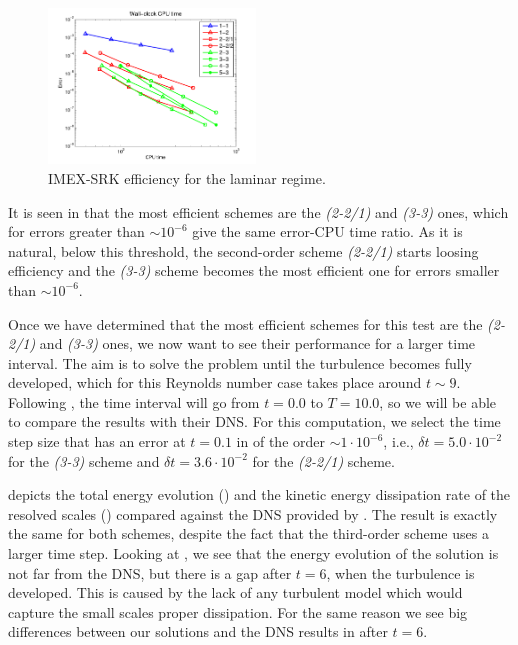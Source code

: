 \begin{figure}[h!]
  \centering
  \includegraphics[width=0.49\textwidth]{Figures/Chapter6/TGV/imex_nsi_explcnv_64_T0_Re1600_dt6dot25e-3_effi}
  \caption{IMEX-SRK efficiency for the laminar regime.}
  \label{fig-TGV_effi_laminar}
\end{figure}
It is seen in  that the most efficient schemes are the \textit{(2-2/1)} and  \textit{(3-3)} ones, which for errors greater than $\sim10^{-6}$ give the same error-CPU time ratio. As it is natural, below this threshold, the second-order scheme \textit{(2-2/1)} starts loosing efficiency and the \textit{(3-3)} scheme becomes the most efficient one for errors smaller than $\sim10^{-6}$.

Once we have determined that the most efficient schemes for this test are the \textit{(2-2/1)} and \textit{(3-3)} ones, we now want to see their performance for a larger time interval. The aim is to solve the problem until the turbulence becomes fully developed, which for this Reynolds number case takes place around $t\sim9$. Following \cite{brachet_direct_1991}, the time interval will go from $t=0.0$ to $T=10.0$, so we will be able to compare the results with their DNS. For this computation, we select the time step size that has an error at $t=0.1$ in  of the order $\sim1\cdot10^{-6}$, i.e., $\delta t=5.0\cdot10^{-2}$ for the \textit{(3-3)} scheme and $\delta t=3.6\cdot10^{-2}$ for the \textit{(2-2/1)} scheme.

 depicts the total energy evolution () and the kinetic energy dissipation rate of the resolved scales () compared against the DNS provided by \cite{brachet_direct_1991}. The result is exactly the same for both schemes, despite the fact that the third-order scheme uses a larger time step. Looking at , we see that the energy evolution of the solution is not far from the DNS, but there is a gap after $t=6$, when the turbulence is developed. This is caused by the lack of any turbulent model which would capture the small scales proper dissipation. For the same reason we see big differences between our solutions and the DNS results in  after $t=6$.

